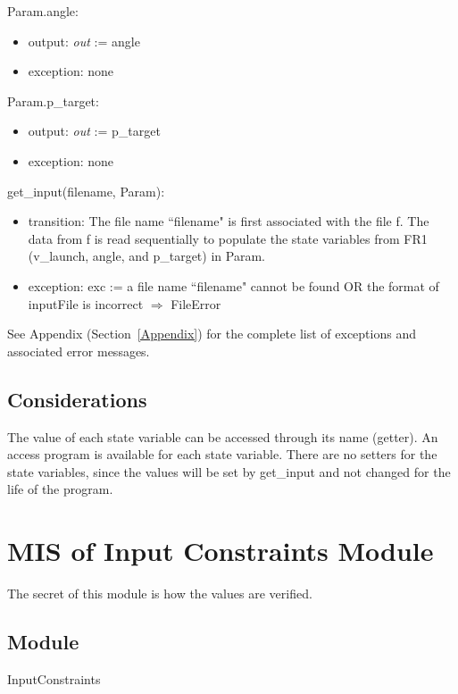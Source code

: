 \documentclass[12pt, titlepage]{article}
\begin{document}
\noindent Param.angle:
\begin{itemize}
\item output: \textit{out} := angle
\item exception: none
\end{itemize}

\noindent Param.p\_target:
\begin{itemize}
\item output: \textit{out} := p\_target
\item exception: none
\end{itemize}

\noindent get\_input(filename, Param):
\begin{itemize}
\item transition: The file name ``filename" is first associated with the file f. 
The data from f is read sequentially to populate the state variables from
FR1 (v\_launch, angle, and p\_target) in Param.
\item exception: exc := a file name ``filename" cannot be found OR the format of
inputFile is incorrect $\Rightarrow$  FileError
\end{itemize}

See Appendix (Section~\ref{Appendix}) for the complete list of exceptions and 
associated error messages.

\subsection{Considerations}

The value of each state variable can be accessed through its name (getter).  An
access program is available for each state variable.  There are no setters for
the state variables, since the values will be set by get\_input and
not changed for the life of the program.

\newpage

\section{MIS of Input Constraints Module} \label{VerifyInput}

The secret of this module is how the values are verified.

\subsection{Module}

InputConstraints
\end{document}
